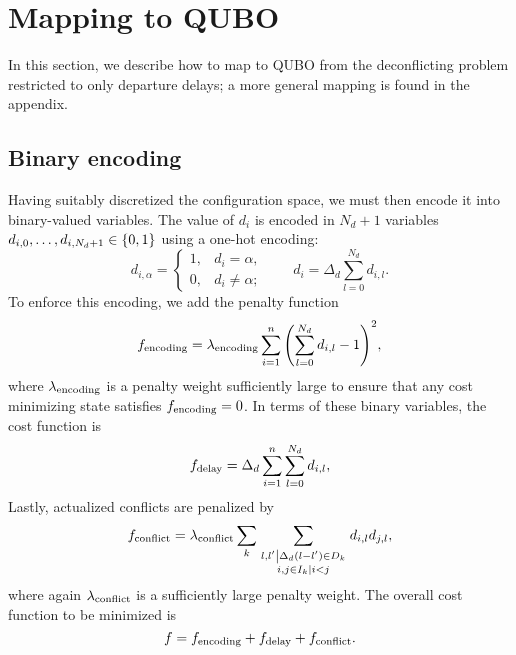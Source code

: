 \section{Mapping to QUBO}
\label{sec:mapping}
In this section, we describe how to map to QUBO from the deconflicting problem restricted to only departure delays; a more general mapping is found in the appendix.

\subsection{Binary encoding}
Having suitably discretized the configuration space, we must then encode it into binary-valued variables.
The value of $d_i$ is encoded in $N_d + 1$ variables $d_{i,0}, \ldots, d_{i,N_d + 1} \in {\{0, 1\}}$ using a one-hot encoding:
\begin{equation}
d_{i, \alpha} = \begin{cases}
1, & d_i = \alpha,\\
0, & d_i \neq \alpha;
\end{cases}
\qquad
d_i = \Delta_d \sum_{l = 0}^{N_d} d_{i,l}.
\end{equation}
To enforce this encoding, we add the penalty function
\begin{equation}
\label{eq:dep-delay-encoding-penalty}
f_{\mathrm{encoding}} = 
\lambda_{\mathrm{encoding}} 
\sum_{i = 1}^n 
{\left(
\sum_{l = 0}^{N_d} d_{i,l} - 1
\right)}^2,
\end{equation}
where $\lambda_{\mathrm{encoding}}$ is a penalty weight sufficiently large to ensure that any cost minimizing state satisfies $f_{\mathrm{encoding}} = 0$.
In terms of these binary variables, the cost function is 
\begin{equation}
\label{departure_delay_model_qubo_departure}
f_{\mathrm{delay}} = 
\Delta_d
\sum_{i=1}^n 
\sum_{l=0}^{N_d} d_{i,l},
\end{equation}
Lastly, actualized conflicts are penalized by 
\begin{equation}
  f_{\mathrm{conflict}}
=
\lambda_{\mathrm{conflict}}
\sum_{k}
\sum_{\substack{\left.l, l' \middle| \Delta_d (l - l') \in D_k\right.\\
\left. i, j \in I_k \middle| i < j \right.}}
  d_{i,l} d_{j, l},
\end{equation}
where again $\lambda_{\mathrm{conflict}}$ is a sufficiently large penalty weight. 
The overall cost function to be minimized is 
\begin{equation}
f
=
f_{\mathrm{encoding}} + f_{\mathrm{delay}} + f_{\mathrm{conflict}}.
\end{equation}



